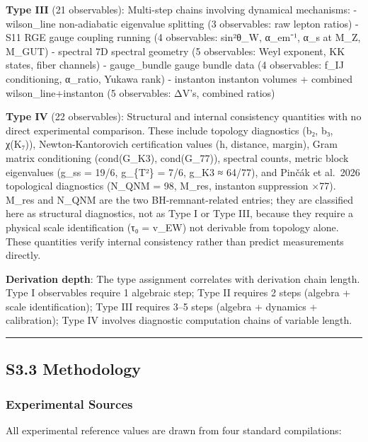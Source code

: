 \documentclass[11pt,a4paper]{article}
\begin{document}
{\textbf{Type III} (21 observables): Multi-step chains involving dynamical mechanisms:
- wilson\_line non-adiabatic eigenvalue splitting (3 observables: raw lepton ratios)
- S11 RGE gauge coupling running (4 observables: sin²θ\_W, α\_em⁻¹, α\_s at M\_Z, M\_GUT)
- spectral 7D spectral geometry (5 observables: Weyl exponent, KK states, fiber channels)
- gauge\_bundle gauge bundle data (4 observables: f\_IJ conditioning, α\_ratio, Yukawa rank)
- instanton instanton volumes + combined wilson\_line+instanton (5 observables: ΔV's, combined ratios)

\textbf{Type IV} (22 observables): Structural and internal consistency quantities with no direct experimental comparison. These include topology diagnostics (b₂, b₃, χ(K₇)), Newton-Kantorovich certification values (h, distance, margin), Gram matrix conditioning (cond(G\_K3), cond(G\_77)), spectral counts, metric block eigenvalues (g\_ss = 19/6, g\_\{T²\} = 7/6, g\_K3 ≈ 64/77), and Pinčák et al.~2026 \cite{46} topological diagnostics (N\_QNM = 98, M\_res, instanton suppression ×77). M\_res and N\_QNM are the two BH-remnant-related entries; they are classified here as structural diagnostics, not as Type I or Type III, because they require a physical scale identification (τ₀ = v\_EW) not derivable from topology alone. These quantities verify internal consistency rather than predict measurements directly.

\textbf{Derivation depth}: The type assignment correlates with derivation chain length. Type I observables require 1 algebraic step; Type II requires 2 steps (algebra + scale identification); Type III requires 3--5 steps (algebra + dynamics + calibration); Type IV involves diagnostic computation chains of variable length.

\begin{center}\rule{0.5\linewidth}{0.5pt}\end{center}

\subsection{S3.3 Methodology}\label{s3.3-methodology}

\subsubsection{Experimental Sources}\label{experimental-sources}

All experimental reference values are drawn from four standard compilations:

}
\end{document}
